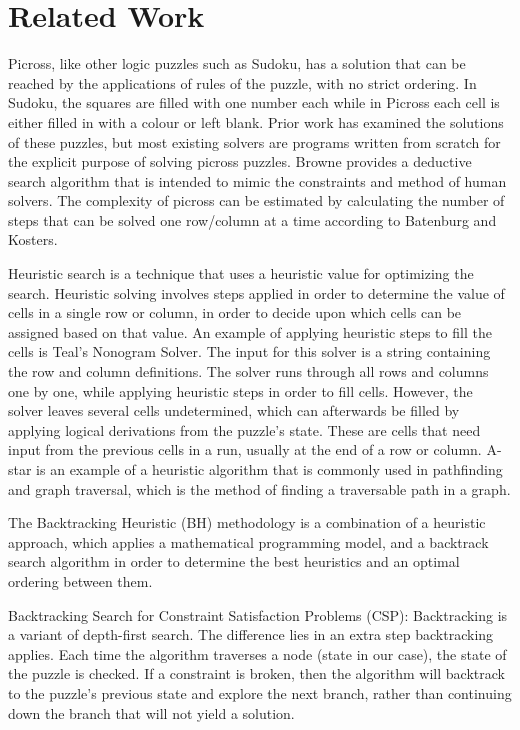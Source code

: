 \documentclass{svproc}
\begin{document}
\section{Related Work}
Picross, like other logic puzzles such as Sudoku, has a solution that can be reached by the applications of rules of the puzzle, with no strict ordering.
In Sudoku, the squares are filled with one number each while in Picross each cell is either filled in with a colour or left blank.
Prior work has examined the solutions of these puzzles, but most existing solvers are programs written from scratch for the explicit purpose of solving picross puzzles\cite{5.1.1,5.1.2,5.1.3,5.1.7}.
Browne provides a deductive search algorithm that is intended to mimic the constraints and method of human solvers\cite{Browne}.
The complexity of picross can be estimated by calculating the number of steps that can be solved one row/column at a time according to Batenburg and Kosters\cite{Batenburg and Kosters}.

Heuristic search is a technique that uses a heuristic value for optimizing the search.
Heuristic solving involves steps applied in order to determine the value of cells in a single row or column\cite{Salcedo}, in order to decide upon which cells can be assigned based on that value\cite{CHYU}.
An example of applying heuristic steps to fill the cells is Teal’s Nonogram Solver\cite{Teal}.
The input for this solver is a string containing the row and column definitions.
The solver runs through all rows and columns one by one, while applying heuristic steps in order to fill cells.
However, the solver leaves several cells undetermined, which can afterwards be filled by applying logical derivations from the puzzle's state.
These are cells that need input from the previous cells in a run, usually at the end of a row or column.
A-star is an example of a heuristic algorithm that is commonly used in pathfinding and graph traversal, which is the method of finding a traversable path in a graph\cite{astar}.

The Backtracking Heuristic (BH) methodology is a combination of a heuristic approach, which applies a mathematical programming model, and a backtrack search algorithm in order to determine the best heuristics and an optimal ordering between them\cite{BH}.

Backtracking Search for Constraint Satisfaction Problems (CSP): Backtracking is a variant of depth-first search.
The difference lies in an extra step backtracking applies.
Each time the algorithm traverses a node (state in our case), the state of the puzzle is checked.
If a constraint is broken, then the algorithm will backtrack to the puzzle's previous state and explore the next branch, rather than continuing down the branch that will not yield a solution.
\end{document}
